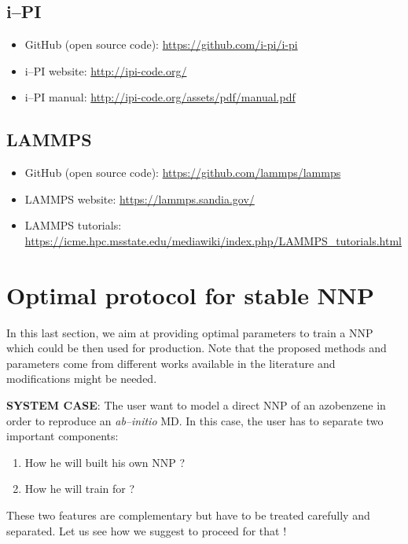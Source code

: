 \documentclass[12pt]{article}
\begin{document}
\subsection{i--PI}
\begin{itemize}
    \item GitHub (open source code): \url{https://github.com/i-pi/i-pi}
    \item i--PI website: \url{http://ipi-code.org/}
    \item i--PI manual: \url{http://ipi-code.org/assets/pdf/manual.pdf}
\end{itemize}
\subsection{LAMMPS}
\begin{itemize}
    \item GitHub (open source code): \url{https://github.com/lammps/lammps}
    \item LAMMPS website: \url{https://lammps.sandia.gov/}
    \item LAMMPS tutorials: \url{https://icme.hpc.msstate.edu/mediawiki/index.php/LAMMPS_tutorials.html}
\end{itemize}

\newpage
{}
\section{Optimal protocol for stable NNP}
In this last section, we aim at providing optimal parameters to train a NNP which could be then used for production. Note that the proposed methods and parameters come from different works available in the literature and modifications might be needed. 

\textbf{SYSTEM CASE}: The user want to model a direct NNP of an azobenzene in order to reproduce an \textit{ab--initio} MD. In this case, the user has to separate two important components:
\begin{enumerate}
    \item How he will built his own NNP ?
    \item How he will train for ?
\end{enumerate}
These two features are complementary but have to be treated carefully and separated. Let us see how we suggest to proceed for that !
\end{document}
